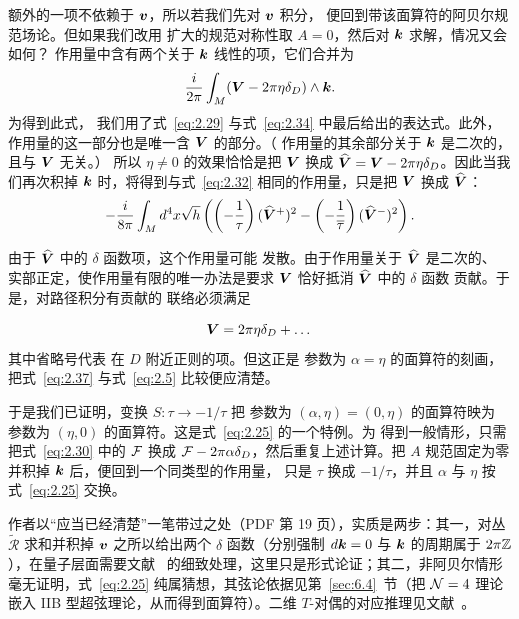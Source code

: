 额外的一项不依赖于 $\bm{v}$，所以若我们先对 $\bm{v}$ 积分，
便回到带该面算符的阿贝尔规范场论。但如果我们改用
扩大的规范对称性取 $A=0$，然后对 $\bm{k}$ 求解，情况又会如何？
作用量中含有两个关于 $\bm{k}$ 线性的项，它们合并为
\setcounter{equation}{34}
\begin{equation}\label{eq:2.35}
  {i\over
2\pi}\int_M(\bm{V}-2\pi\eta\delta_D)\wedge \bm{k}.
\end{equation}
 为得到此式，
我们用了式~\eqref{eq:2.29} 与式~\eqref{eq:2.34} 中最后给出的表达式。此外，
作用量的这一部分也是唯一含 $\bm{V}$ 的部分。（
作用量的其余部分关于 $\bm{k}$ 是二次的，且与 $\bm{V}$ 无关。）
所以 $\eta\not=0$ 的效果恰恰是把 $\bm{V}$
换成 $\widehat {\bm{V}}=\bm{V}-2\pi\eta\delta_D$。因此当我们再次积掉
$\bm{k}$ 时，将得到与式~\eqref{eq:2.32} 相同的作用量，只是把 $\bm{V}$
换成 $\widehat {\bm{V}}$：
\setcounter{equation}{35}
\begin{equation}\label{eq:2.36}
  -{i\over 8\pi}\int_Md^4x\sqrt
h\left(\left(-{1\over\tau}\right)(\widehat
{\bm{V}}^+)^2-\left(-{1\over\overline\tau}\right)(\widehat {\bm{V}}^-)^2\right).
\end{equation}


由于 $\widehat {\bm{V}}$ 中的 $\delta$ 函数项，这个作用量可能
发散。由于作用量关于 $\widehat {\bm{V}}$ 是二次的、
实部正定，使作用量有限的唯一办法是要求
$\bm{V}$ 恰好抵消 $\widehat {\bm{V}}$ 中的 $\delta$ 函数
贡献。于是，对路径积分有贡献的
联络必须满足

\setcounter{equation}{36}
\begin{equation}\label{eq:2.37}
  \bm{V}=2\pi\eta\delta_D+\dots
\end{equation}
 其中省略号代表
在 $D$ 附近正则的项。但这正是
参数为 $\alpha=\eta$ 的面算符的刻画，
把式~\eqref{eq:2.37} 与式~\eqref{eq:2.5} 比较便应清楚。

于是我们已证明，变换 $S:\tau\to -1/\tau$ 把
参数为 $(\alpha,\eta)=(0,\eta)$ 的面算符映为
参数为 $(\eta,0)$ 的面算符。这是式~\eqref{eq:2.25} 的一个特例。为
得到一般情形，只需把式~\eqref{eq:2.30} 中的 ${\mathcal F}$ 换成
${\mathcal F}-2\pi\alpha\delta_D$，然后重复上述计算。把 $A$
规范固定为零并积掉 $\bm{k}$ 后，便回到一个同类型的作用量，
只是 $\tau$ 换成 $-1/\tau$，并且 $\alpha$ 与 $\eta$ 按式~\eqref{eq:2.25} 交换。

\begin{yizhu}[含糊点拨]作者以“应当已经清楚”一笔带过之处（PDF 第 19 页），实质是两步：其一，对丛 $\tilde{\mathcal R}$ 求和并积掉 $\bm{v}$ 之所以给出两个 $\delta$ 函数（分别强制 $d\bm{k}=0$ 与 $\bm{k}$ 的周期属于 $2\pi{\mathbb{Z}}$），在量子层面需要文献~\cite{ref43} 的细致处理，这里只是形式论证；其二，非阿贝尔情形毫无证明，式~\eqref{eq:2.25} 纯属猜想，其弦论依据见第~\ref{sec:6.4}~节（把 ${\cal N}=4$ 理论嵌入 IIB 型超弦理论，从而得到面算符）。二维 $T$-对偶的对应推理见文献~\cite{ref44,ref45}。\end{yizhu}



